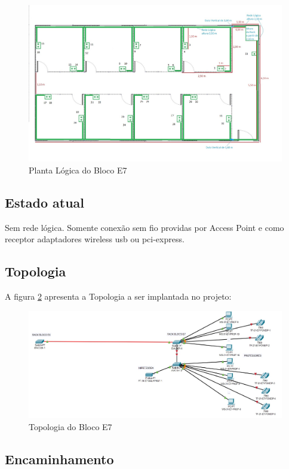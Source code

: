 \documentclass[	DIV=calc,
							paper=a4,
							fontsize=12pt,
							onecolumn]{scrartcl}
\begin{document}
\begin{figure}
	\centering
	\includegraphics[]{logica.jpg}
	\caption{Planta Lógica do Bloco E7}
	\label{logica}
\end{figure}

\subsection{Estado atual}
Sem rede lógica. Somente conexão sem fio providas por Access Point e como receptor adaptadores wireless usb ou pci-express.

\subsection{Topologia}

A figura \ref{topologia} apresenta a Topologia a ser implantada no projeto:

\begin{figure}
	\centering
	\includegraphics[]{topologia.jpg}
	\caption{Topologia do Bloco E7}
	\label{topologia}
\end{figure}

\subsection{Encaminhamento}
\end{document}
